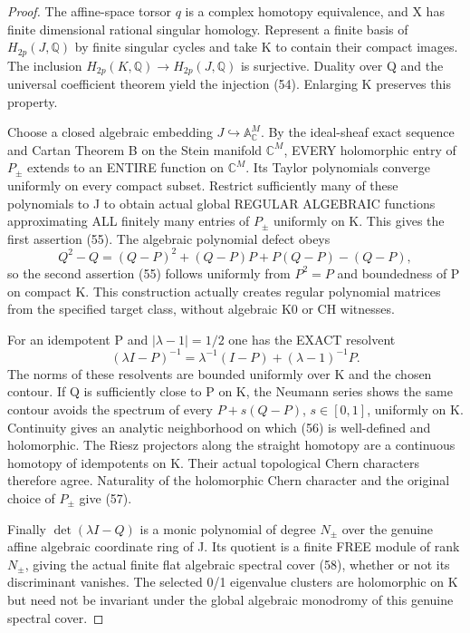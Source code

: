\documentclass[11pt]{article}
\begin{document}
\begin{proof}
The affine-space torsor $q$ is a complex
homotopy equivalence, and X has finite
dimensional rational singular homology.
Represent a finite basis of
$H_{2p}(J,\mathbb Q)$ by finite singular
cycles and take K to contain their
compact images. The inclusion
$H_{2p}(K,\mathbb Q)\to H_{2p}(J,\mathbb Q)$
is surjective. Duality over Q and the
universal coefficient theorem yield
the injection (54). Enlarging K
preserves this property.

Choose a closed algebraic embedding
$J\hookrightarrow\mathbb A_{\mathbb C}^M$.
By the ideal-sheaf exact sequence and
Cartan Theorem B on the Stein manifold
$\mathbb C^M$, EVERY holomorphic entry
of $P_\pm$ extends to an ENTIRE function
on $\mathbb C^M$. Its Taylor polynomials
converge uniformly on every compact
subset. Restrict sufficiently many of
these polynomials to J to obtain actual
global REGULAR ALGEBRAIC functions
approximating ALL finitely many entries
of $P_\pm$ uniformly on K.
This gives the first assertion (55).
The algebraic polynomial defect obeys
\[
 Q^2-Q=(Q-P)^2+(Q-P)P+P(Q-P)-(Q-P),
\]
so the second assertion (55) follows
uniformly from $P^2=P$ and boundedness
of P on compact K.
This construction actually creates
regular polynomial matrices from the
specified target class, without
algebraic K0 or CH witnesses.

For an idempotent P and
$|\lambda-1|=1/2$ one has the
EXACT resolvent
\[
 (\lambda I-P)^{-1}=
 \lambda^{-1}(I-P)+(\lambda-1)^{-1}P .
\]
The norms of these resolvents are
bounded uniformly over K and the
chosen contour. If Q is sufficiently
close to P on K, the Neumann series
shows the same contour avoids the
spectrum of every $P+s(Q-P)$,
$s\in[0,1]$, uniformly on K.
Continuity gives an analytic
neighborhood on which (56) is
well-defined and holomorphic.
The Riesz projectors along the
straight homotopy are a continuous
homotopy of idempotents on K.
Their actual topological Chern
characters therefore agree.
Naturality of the holomorphic
Chern character and the original
choice of $P_\pm$ give (57).

Finally
$\det(\lambda I-Q)$ is a monic
polynomial of degree $N_\pm$
over the genuine affine algebraic
coordinate ring of J. Its quotient
is a finite FREE module of rank
$N_\pm$, giving the actual
finite flat algebraic spectral
cover (58), whether or not
its discriminant vanishes.
The selected 0/1 eigenvalue
clusters are holomorphic on K
but need not be invariant under
the global algebraic monodromy
of this genuine spectral cover.
\end{proof}
\end{document}
